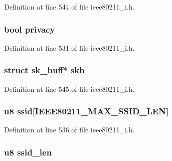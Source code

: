 Definition at line 544 of file ieee80211\-\_\-i.\-h.

\hypertarget{structieee80211__if__ibss_a416c8f7c70b4e5fdcd31edb1cd9004ab}{
\subsubsection[{privacy}]{\setlength{\rightskip}{0pt plus 5cm}bool privacy}}\label{structieee80211__if__ibss_a416c8f7c70b4e5fdcd31edb1cd9004ab}


Definition at line 531 of file ieee80211\-\_\-i.\-h.

\hypertarget{structieee80211__if__ibss_aeba6836824708325a83121030f092c30}{
\subsubsection[{skb}]{\setlength{\rightskip}{0pt plus 5cm}struct sk\-\_\-buff$\ast$ skb}}\label{structieee80211__if__ibss_aeba6836824708325a83121030f092c30}


Definition at line 545 of file ieee80211\-\_\-i.\-h.

\hypertarget{structieee80211__if__ibss_ae8d768cff77168f424870b6745c90714}{
\subsubsection[{ssid}]{\setlength{\rightskip}{0pt plus 5cm}u8 ssid\mbox{[}I\-E\-E\-E80211\-\_\-\-M\-A\-X\-\_\-\-S\-S\-I\-D\-\_\-\-L\-E\-N\mbox{]}}}\label{structieee80211__if__ibss_ae8d768cff77168f424870b6745c90714}


Definition at line 536 of file ieee80211\-\_\-i.\-h.

\hypertarget{structieee80211__if__ibss_a440f44724caffefa0f9c838518a3c790}{
\subsubsection[{ssid\-\_\-len}]{\setlength{\rightskip}{0pt plus 5cm}u8 ssid\-\_\-len}}\label{structieee80211__if__ibss_a440f44724caffefa0f9c838518a3c790}


